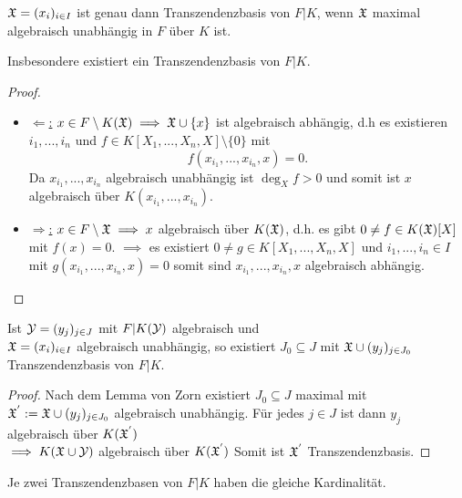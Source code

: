 \begin{satz}
    $\mathfrak{X} = (x_i)_{i \in I}$ ist genau dann Transzendenzbasis von $F|K$,
    wenn $\mathfrak{X}$ maximal algebraisch unabhängig in $F$ über $K$ ist.
    
    Insbesondere existiert ein Transzendenzbasis von $F|K$.
\end{satz}

\begin{proof}
    \begin{itemize}[label=]
        \item \underline{$\Leftarrow$:} $x \in F \setminus K(\mathfrak{X}) \implies \mathfrak{X} \cup \{x\}$ ist algebraisch abhängig, 
        d.h es existieren $i_1,...,i_n$ und $f \in K[X_1,...,X_n, X] \setminus \{0\}$ mit 
        $$ f(x_{i_1},...,x_{i_n},x) = 0. $$
        Da $x_{i_1},...,x_{i_n}$ algebraisch unabhängig ist $\deg_X f > 0$ 
        und somit ist $x$ algebraisch über $K(x_{i_1},...,x_{i_n})$.
        
        \item \underline{$\Rightarrow$:} $x \in F \setminus \mathfrak{X} \implies x$ algebraisch über $K(\mathfrak{X})$,
        d.h. es gibt $0 \neq f \in K(\mathfrak{X})[X]$ mit $f(x) = 0$. 
        $\implies$ es existiert $0\neq g \in K[X_1,...,X_n,X]$ und $i_1,...,i_n \in I$ mit
        $g(x_{i_1},...,x_{i_n},x) = 0$ somit sind $x_{i_1},...,x_{i_n},x$ algebraisch abhängig.
    \end{itemize}
\end{proof}

\begin{lemma}[Austauschlemma]\label{lemma:exchange}
    Ist $\mathcal{Y}=(y_j)_{j \in J}$ mit $F|K(\mathcal{Y})$ algebraisch und \\
    $\mathfrak{X} = (x_i)_{i \in I}$ algebraisch unabhängig,
    so existiert $J_0 \subseteq J$ mit $\mathfrak{X} \cup (y_j)_{j\in J_0}$ Transzendenzbasis von $F|K$.
\end{lemma}
\begin{proof}
    Nach dem Lemma von Zorn existiert $J_0 \subseteq J$ maximal mit 
    $\mathfrak{X}^{'} := \mathfrak{X} \cup (y_j)_{j \in J_0}$ algebraisch unabhängig.
    Für jedes $j \in J$ ist dann $y_j$ algebraisch über $K(\mathfrak{X}^{'})$\\
    $\implies K(\mathfrak{X}\cup \mathcal{Y})$ algebraisch über $K(\mathfrak{X}^{'})$
    Somit ist $\mathfrak{X}^{'}$ Transzendenzbasis.
\end{proof}

\begin{satz}[Steinitz, 1910]
    Je zwei Transzendenzbasen von $F|K$ haben die gleiche Kardinalität.
\end{satz}

